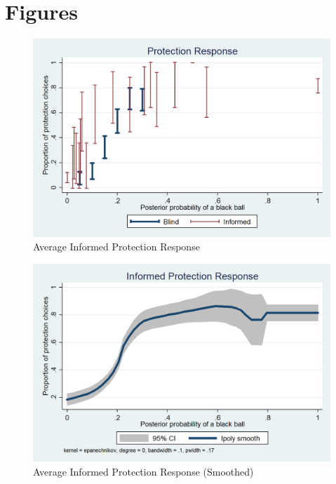 \documentclass[11pt,a4paper]{article}
\begin{document}
%


\section{Figures}

\begin{figure}[H]
\centering
\caption{Average Informed Protection Response} \label{Informed Protection Responses}

  \centering
  \includegraphics[scale=0.3]{Graphs/ip_response_comp.png}

\end{figure}


\begin{figure}[H]
\centering
\caption{Average Informed Protection Response (Smoothed)} \label{Informed Protection Responses}

  \centering
  \includegraphics[scale=0.3]{Graphs/ip_response_lpoly.png}

\end{figure}
\end{document}
